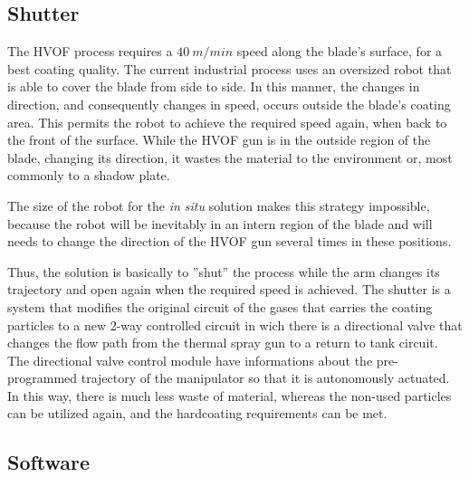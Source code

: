 \subsection{Shutter}

The HVOF process requires a $40~m/min$ speed along the blade's surface, for a
best coating quality. 
The current industrial process uses an oversized robot that is able to
cover the blade from side to side. In this manner, the changes in direction, and
consequently changes in speed, occurs outside the blade's coating area.
This permits the robot to achieve the required speed again, when back to the
front of the surface.
While the HVOF gun is in the outside region of the blade, changing its
direction, it wastes the material to the environment or, most commonly to a
shadow plate.

The size of the robot for the \textit{in situ} solution makes this strategy
impossible, because the robot will be inevitably in an intern region of the blade and will
needs to change the direction of the HVOF gun several times in these
positions. 

Thus, the solution is basically to ''shut'' the process while the arm changes
its trajectory and open again when the required speed is achieved.
The shutter is a system that modifies the original circuit of the gases that
carries the coating particles to a new 2-way controlled circuit in wich there 
is a directional valve that changes the flow path from the thermal spray gun to
a return to tank circuit. 
The directional valve control module have informations about the pre-programmed
trajectory of the manipulator so that it is autonomously actuated.
In this way, there is much less waste of material, whereas the non-used
particles can be utilized again, and the hardcoating requirements can be met.




\subsection{Software}